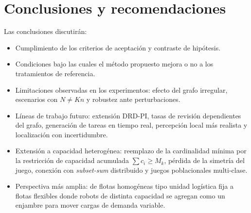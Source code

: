 ﻿%
\section{Conclusiones y recomendaciones}
\label{sec:conclusiones}

Las conclusiones discutirán:

\begin{itemize}
  \item Cumplimiento de los criterios de aceptación y contraste de hipótesis.
  \item Condiciones bajo las cuales el método propuesto mejora o no a los
    tratamientos de referencia.
  \item Limitaciones observadas en los experimentos: efecto del grafo irregular,
    escenarios con $N \neq Kn$ y robustez ante perturbaciones.
  \item Líneas de trabajo futuro: extensión DRD-PI, tasas de revisión
    dependientes del grafo, generación de tareas en tiempo real, percepción local más
    realista y localización con incertidumbre.
  \item Extensión a capacidad heterogénea: reemplazo de la cardinalidad mínima por la
    restricción de capacidad acumulada $\sum c_i \geq M_k$, pérdida de la simetría del
    juego, conexión con \emph{subset-sum} distribuido y juegos poblacionales multi-clase.
  \item Perspectiva más amplia: de flotas homogéneas tipo unidad logística fija a flotas
    flexibles donde robots de distinta capacidad se agregan como un enjambre para mover
    cargas de demanda variable.
\end{itemize}
